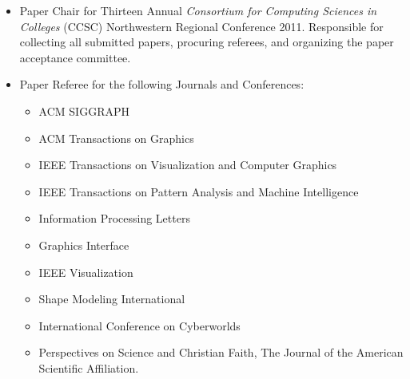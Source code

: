 \documentclass[10pt]{article}
\begin{document}
\begin{itemize}
\item Paper Chair for Thirteen Annual {\em Consortium for Computing Sciences in Colleges} (CCSC)
Northwestern Regional Conference 2011. Responsible for collecting all submitted papers, procuring referees, and organizing the paper acceptance committee.

\item Paper Referee for the following Journals and Conferences:
\begin{itemize}
\item ACM SIGGRAPH
\item ACM Transactions on Graphics
\item IEEE Transactions on Visualization and Computer Graphics
\item IEEE Transactions on Pattern Analysis and Machine Intelligence
\item Information Processing Letters
\item Graphics Interface
\item IEEE Visualization
\item Shape Modeling International
\item International Conference on Cyberworlds
\item Perspectives on Science and Christian Faith, The Journal of the
  American Scientific Affiliation.
\end{itemize}
\end{itemize}




\end{document}
